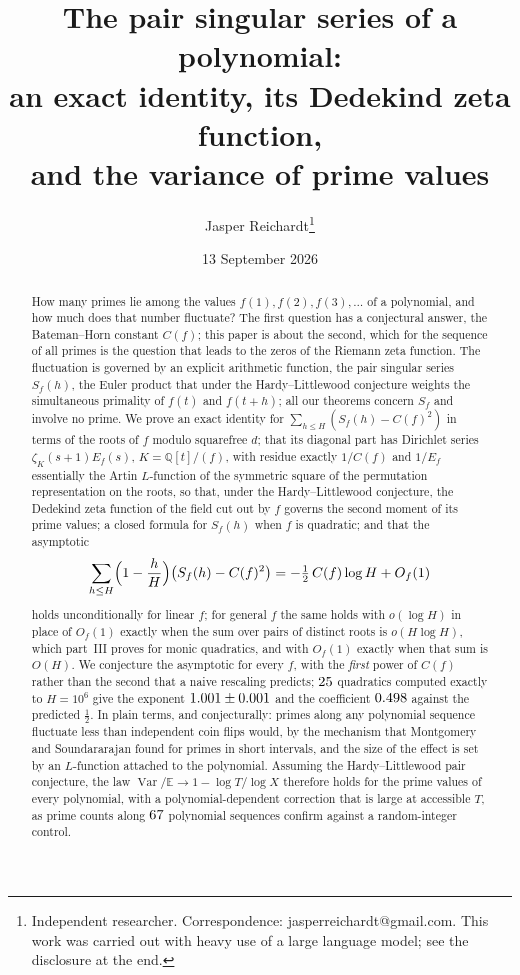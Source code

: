 \documentclass[11pt,a4paper]{article}
\title{The pair singular series of a polynomial:\\ an exact identity, its Dedekind zeta function,\\ and the variance of prime values}
\author{Jasper Reichardt\thanks{Independent researcher. Correspondence: jasperreichardt@gmail.com. This work was
carried out with heavy use of a large language model; see the disclosure at the end.}}
\date{13 September 2026}
\theoremstyle{remark}\newtheorem{remark}[theorem]{Remark}
\newcommand{\Q}{\mathbb{Q}}
\newcommand{\Var}{\operatorname{Var}}
\newcommand{\E}{\mathbb{E}}
\begin{document}
\maketitle

\begin{abstract}
How many primes lie among the values $f(1),f(2),f(3),\dots$ of a polynomial, and how much does that
number fluctuate? The first question has a conjectural answer, the Bateman--Horn constant $C(f)$; this
paper is about the second, which for the sequence of all primes is the question that leads to the zeros
of the Riemann zeta function. The fluctuation is governed by an explicit arithmetic function, the pair
singular series $S_f(h)$, the Euler product that under the Hardy--Littlewood conjecture weights the
simultaneous primality of $f(t)$ and $f(t+h)$; all our theorems concern $S_f$ and involve no prime. We
prove an exact identity for $\sum_{h\le H}(S_f(h)-C(f)^2)$ in terms of the roots of $f$ modulo squarefree
$d$; that its diagonal part has Dirichlet series $\zeta_K(s+1)E_f(s)$, $K=\Q[t]/(f)$, with residue exactly
$1/C(f)$ and $1/E_f$ essentially the Artin $L$-function of the symmetric square of the permutation
representation on the roots, so that, under the Hardy--Littlewood conjecture, the Dedekind zeta function of the
field cut out by $f$ governs the second moment of its prime values; a closed formula for $S_f(h)$ when $f$ is quadratic; and that the
asymptotic
\[
\sum_{h\le H}\Bigl(1-\frac hH\Bigr)\bigl(S_f(h)-C(f)^2\bigr)=-\tfrac12\,C(f)\log H+O_f(1)
\]
holds unconditionally for linear $f$; for general $f$ the same holds with $o(\log H)$ in place of $O_f(1)$ exactly when the
sum over pairs of distinct roots is $o(H\log H)$, which part~III proves for monic quadratics, and with $O_f(1)$ exactly when
that sum is $O(H)$. We conjecture the asymptotic for every $f$, with the \emph{first} power of $C(f)$
rather than the second that a naive rescaling predicts; $25$ quadratics computed exactly to $H=10^6$
give the exponent $1.001\pm0.001$ and the coefficient $0.498$ against the predicted $\tfrac12$. In plain terms, and conjecturally: primes along any polynomial sequence fluctuate
less than independent coin flips would, by the mechanism that Montgomery and Soundararajan found for
primes in short intervals, and the size of the effect is set by an $L$-function attached to the
polynomial. Assuming the Hardy--Littlewood pair conjecture, the law $\Var/\E\to1-\log T/\log X$ therefore
holds for the prime values of every polynomial, with a polynomial-dependent correction that is large at
accessible $T$, as prime counts along $67$ polynomial sequences confirm against a random-integer
control.
\end{abstract}
\end{document}
